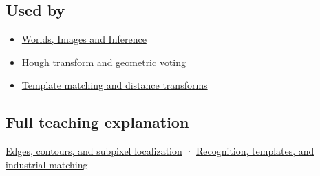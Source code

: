 \subsection{Used by}\label{appendix-36022286b03e-used-by}

\begin{itemize}
\tightlist
\item
  \href{Continuous\%20Notes/University\%20-\%20Worlds,\%20Images\%20and\%20Inference\%20-\%20Graphics,\%20Vision\%20and\%20Photography}{Worlds, Images and Inference}
\item
  \hyperref[appendix-a5b0383b3b3e]{Hough transform and geometric voting}
\item
  \hyperref[appendix-5fb4af80d1c7]{Template matching and distance transforms}
\end{itemize}

\subsection{Full teaching explanation}\label{appendix-36022286b03e-full-teaching-explanation}

\hyperref[04-visual-computing-ii-ch030-edges-contours-and-subpixel-localization]{Edges, contours, and subpixel localization} · \hyperref[04-visual-computing-ii-ch030-recognition-templates-and-industrial-matching]{Recognition, templates, and industrial matching}
